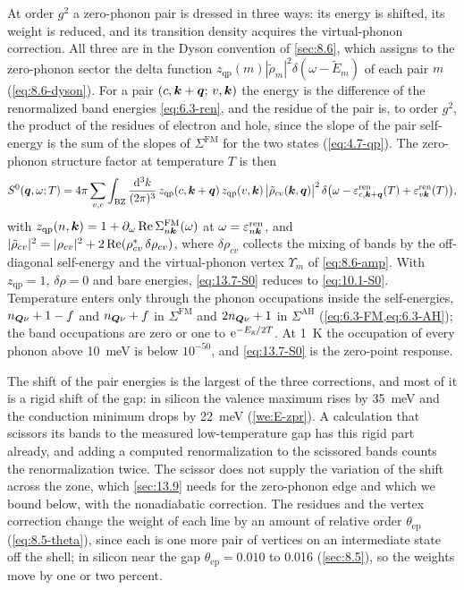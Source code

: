 At order $g^2$ a zero-phonon pair is dressed in three ways: its energy is shifted, its weight is reduced, and its transition density acquires the virtual-phonon correction. All three are in the Dyson convention of \cref{sec:8.6}, which assigns to the zero-phonon sector the delta function $z_{\mathrm{qp}}(m)|\tilde\rho_m|^2\delta(\omega - \tilde E_m)$ of each pair $m$ (\cref{eq:8.6-dyson}). For a pair $(c,\bm{k}+\bm{q};\,v,\bm{k})$ the energy is the difference of the renormalized band energies \cref{eq:6.3-ren}, and the residue of the pair is, to order $g^2$, the product of the residues of electron and hole, since the slope of the pair self-energy is the sum of the slopes of $\Sigma^{\mathrm{FM}}$ for the two states (\cref{eq:4.7-qp}). The zero-phonon structure factor at temperature $T$ is then
\begin{equation}
  S^0(\bm{q},\omega;T) = 4\pi\sum_{v,c}\int_{\mathrm{BZ}}\frac{\mathrm{d}^3k}{(2\pi)^3}\,
  z_{\mathrm{qp}}(c,\bm{k}+\bm{q})\,z_{\mathrm{qp}}(v,\bm{k})\,\bigl|\tilde\rho_{cv}(\bm{k},\bm{q})\bigr|^2\,
  \delta\bigl(\omega - \varepsilon^{\mathrm{ren}}_{c,\bm{k}+\bm{q}}(T) + \varepsilon^{\mathrm{ren}}_{v\bm{k}}(T)\bigr) ,
  \label{eq:13.7-S0}
\end{equation}
with $z_{\mathrm{qp}}(n,\bm{k}) = 1 + \partial_\omega\operatorname{Re}\Sigma^{\mathrm{FM}}_{n\bm{k}}(\omega)$ at $\omega = \varepsilon^{\mathrm{ren}}_{n\bm{k}}$, and $|\tilde\rho_{cv}|^2 = |\rho_{cv}|^2 + 2\operatorname{Re}(\rho_{cv}^*\,\delta\rho_{cv})$, where $\delta\rho_{cv}$ collects the mixing of bands by the off-diagonal self-energy and the virtual-phonon vertex $\Upsilon_m$ of \cref{eq:8.6-amp}. With $z_{\mathrm{qp}} = 1$, $\delta\rho = 0$ and bare energies, \cref{eq:13.7-S0} reduces to \cref{eq:10.1-S0}. Temperature enters only through the phonon occupations inside the self-energies, $n_{\bm{Q}\nu} + 1 - f$ and $n_{\bm{Q}\nu} + f$ in $\Sigma^{\mathrm{FM}}$ and $2n_{\bm{Q}\nu} + 1$ in $\Sigma^{\mathrm{AH}}$ (\cref{eq:6.3-FM,eq:6.3-AH}); the band occupations are zero or one to $\mathrm{e}^{-E_{\mathrm{g}}/2T}$. At \SI{1}{K} the occupation of every phonon above \SI{10}{meV} is below $10^{-50}$, and \cref{eq:13.7-S0} is the zero-point response.

The shift of the pair energies is the largest of the three corrections, and most of it is a rigid shift of the gap: in silicon the valence maximum rises by \SI{35}{meV} and the conduction minimum drops by \SI{22}{meV} (\cref{we:E-zpr}). A calculation that scissors its bands to the measured low-temperature gap has this rigid part already, and adding a computed renormalization to the scissored bands counts the renormalization twice. The scissor does not supply the variation of the shift across the zone, which \cref{sec:13.9} needs for the zero-phonon edge and which we bound below, with the nonadiabatic correction. The residues and the vertex correction change the weight of each line by an amount of relative order $\theta_{\mathrm{ep}}$ (\cref{eq:8.5-theta}), since each is one more pair of vertices on an intermediate state off the shell; in silicon near the gap $\theta_{\mathrm{ep}} = 0.010$ to 0.016 (\cref{sec:8.5}), so the weights move by one or two percent.

